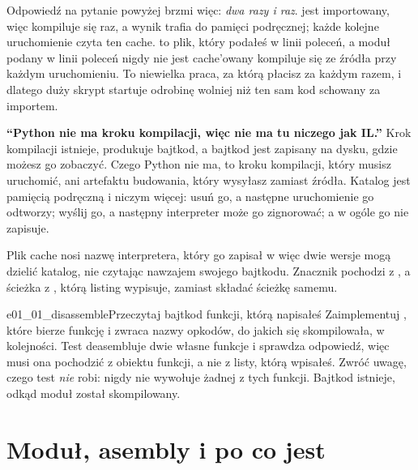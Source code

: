 \noindent
Odpowiedź na pytanie powyżej brzmi więc: \emph{dwa razy i raz}.
 jest importowany, więc kompiluje się raz, a wynik trafia do
pamięci podręcznej; każde kolejne uruchomienie czyta ten cache.
 to plik, który podałeś w linii poleceń, a moduł podany w linii
poleceń nigdy nie jest cache'owany \dash{} kompiluje się ze źródła przy
każdym uruchomieniu. To niewielka praca, za którą płacisz za każdym razem, i
dlatego duży skrypt startuje odrobinę wolniej niż ten sam kod schowany za
importem.

\begin{trapbox}
\textbf{\enquote{Python nie ma kroku kompilacji, więc nie ma tu niczego jak
IL.}} Krok kompilacji istnieje, produkuje bajtkod, a bajtkod jest zapisany na
dysku, gdzie możesz go zobaczyć. Czego Python nie ma, to kroku kompilacji,
który musisz uruchomić, ani artefaktu budowania, który wysyłasz zamiast
źródła. Katalog  jest pamięcią podręczną i niczym
więcej: usuń go, a następne uruchomienie go odtworzy; wyślij go, a następny
interpreter może go zignorować; a  w ogóle go nie zapisuje.
\end{trapbox}


\begin{note}
Plik cache nosi nazwę interpretera, który go zapisał \dash{}
 w \pyver{} \dash{} więc dwie wersje mogą dzielić
katalog, nie czytając nawzajem swojego bajtkodu. Znacznik pochodzi z
, a ścieżka z
, którą listing wypisuje, zamiast
składać ścieżkę samemu.
\end{note}

\begin{exercise}{e01_01_disassemble}{Przeczytaj bajtkod funkcji, którą napisałeś}
Zaimplementuj , które bierze funkcję i zwraca nazwy
opkodów, do jakich się skompilowała, w kolejności. Test deasembluje dwie
własne funkcje i sprawdza odpowiedź, więc musi ona pochodzić z obiektu
funkcji, a nie z listy, którą wpisałeś. Zwróć uwagę, czego test \emph{nie}
robi: nigdy nie wywołuje żadnej z tych funkcji. Bajtkod istnieje, odkąd moduł
został skompilowany.
\end{exercise}

\section{Moduł, asembly i po co jest }
\label{sec:ch01-main}

